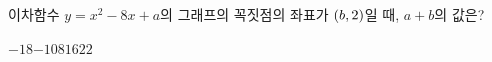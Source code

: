 이차함수 $y=x^2-8x+a$의 그래프의 꼭짓점의 좌표가 $(b{,}\mkern3mu 2)$일 때, $a+b$의 값은? 
\begin{choices32}{$-18$}{$-10$}{$8$}{$16$}{$22$}\end{choices32}
